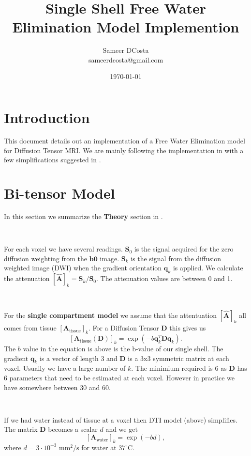 \documentclass[12pt]{article}
\title{Single Shell Free Water Elimination Model Implemention}
\author{
  Sameer DCosta \\
    sameerdcosta@gmail.com
}
\date{\today}
\newcommand{\vect}[1]{\mathbf{#1}}
\begin{document}
\maketitle

\section{Introduction}
This document details out an implementation of a Free Water Elimination model
for Diffusion Tensor MRI. We are mainly following the implementation in
\cite{Pasternak2009} with a few simplifications suggested in \cite{Pasternak2014}.

\section{Bi-tensor Model}
In this section we summarize the \textbf{Theory} section in
\cite{Pasternak2009}. 

\ 

\noindent
For each voxel we have several readings. $\vect{S}_0$ is the signal acquired
for the zero diffusion weighting from the $\vect{b0}$ image. $\vect{S}_k$ is
the signal from the diffusion weighted image (DWI) when the gradient
orientation $\vect{q}_k$ is applied. We calculate the attenuation
$[\hat{\vect{A}}]_k = \vect{S}_k / \vect{S}_0$. The attenuation values are
between 0 and 1. 

\ 

\noindent
For the \textbf{single compartment model} we assume that the attentuation
$[\hat{\vect{A}}]_k$ all comes from tissue $[\vect{A}_{\text{tissue}}]_k$. For a Diffusion Tensor $\vect{D}$ this gives us 
$$[\vect{A}_{\text{tissue}}(\vect{D})]_k = \exp(-b
\vect{q}_k^T\vect{D}\vect{q}_k).$$
The $b$ value in the equation is above is the b-value of our single shell. The
gradient $\vect{q}_k$ is a vector of length 3 and $\vect{D}$ is a 3x3 symmetric
matrix at each voxel. Usually we have a large number of $k$. The minimium
required is 6 as $\vect{D}$ has 6 parameters that need to be estimated at each
voxel.  However in practice we have somewhere between 30 and 60. 

\ 

\noindent
If we had water instead of tissue at a voxel then DTI model (above) simplifies. The matrix $\vect{D}$ becomes a scalar $d$ and we get
$$[\vect{A}_{\text{water}}]_k = \exp(-bd),$$ where $d = 3 \cdot 10^{-3}$
$\text{mm}^2/\text{s}$ for water at $37^\circ$C.
\end{document}
